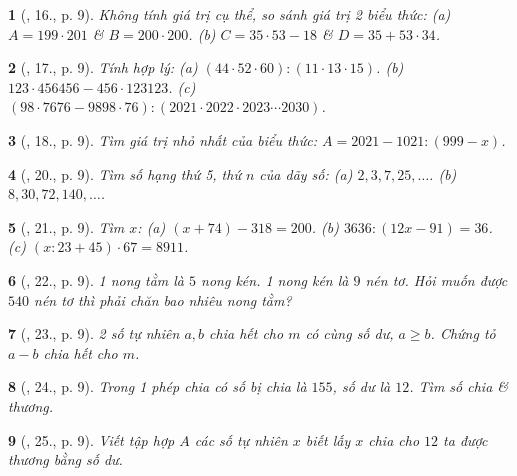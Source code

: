 \documentclass{article}
\newtheorem{baitoan}{}
\begin{document}
\begin{baitoan}[\cite{Tuyen_Toan_6}, 16., p. 9]
	Không tính giá trị cụ thể, so sánh giá trị 2 biểu thức: (a) $A = 199\cdot201$ \& $B = 200\cdot200$. (b) $C = 35\cdot53 - 18$ \& $D = 35 + 53\cdot34$.
\end{baitoan}

\begin{baitoan}[\cite{Tuyen_Toan_6}, 17., p. 9]
	Tính hợp lý: (a) $(44\cdot52\cdot60):(11\cdot13\cdot15)$. (b) $123\cdot456456 - 456\cdot123123$. (c) $(98\cdot7676 - 9898\cdot76):(2021\cdot2022\cdot2023\cdots2030)$.
\end{baitoan}

\begin{baitoan}[\cite{Tuyen_Toan_6}, 18., p. 9]
	Tìm giá trị nhỏ nhất của biểu thức: $A = 2021 - 1021:(999 - x)$.
\end{baitoan}

\begin{baitoan}[\cite{Tuyen_Toan_6}, 20., p. 9]
	Tìm số hạng thứ 5, thứ $n$ của dãy số: (a) $2,3,7,25,\ldots$. (b) $8,30,72,140,\ldots$.
\end{baitoan}

\begin{baitoan}[\cite{Tuyen_Toan_6}, 21., p. 9]
	Tìm $x$: (a) $(x + 74) - 318 = 200$. (b) $3636:(12x - 91) = 36$. (c) $(x:23 + 45)\cdot67 = 8911$.
\end{baitoan}

\begin{baitoan}[\cite{Tuyen_Toan_6}, 22., p. 9]
	1 nong tằm là $5$ nong kén. 1 nong kén là $9$ nén tơ. Hỏi muốn được $540$ nén tơ thì phải chăn bao nhiêu nong tằm?
\end{baitoan}

\begin{baitoan}[\cite{Tuyen_Toan_6}, 23., p. 9]
	2 số tự nhiên $a,b$ chia hết cho $m$ có cùng số dư, $a\ge b$. Chứng tỏ $a - b$ chia hết cho $m$.
\end{baitoan}

\begin{baitoan}[\cite{Tuyen_Toan_6}, 24., p. 9]
	Trong 1 phép chia có số bị chia là $155$, số dư là $12$. Tìm số chia \& thương.
\end{baitoan}

\begin{baitoan}[\cite{Tuyen_Toan_6}, 25., p. 9]
	Viết tập hợp $A$ các số tự nhiên $x$ biết lấy $x$ chia cho $12$ ta được thương bằng số dư.
\end{baitoan}
\end{document}
